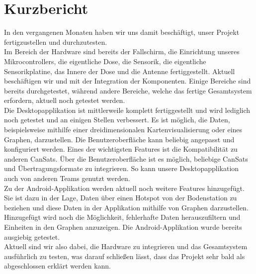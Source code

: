 \section{Kurzbericht}
In den vergangenen Monaten haben wir uns damit beschäftigt, unser Projekt fertigzustellen und durchzutesten. \\
Im Bereich der Hardware sind bereits der Fallschirm, die Einrichtung unseres Mikrocontrollers, die eigentliche Dose, die Sensorik, die eigentliche Sensorikplatine, das Innere der Dose und die Antenne fertiggestellt. Aktuell beschäftigen wir und mit der Integration der Komponenten. Einige Bereiche sind bereits durchgetestet, während andere Bereiche, welche das fertige Gesamtsystem erfordern, aktuell noch getestet werden. \\
Die Desktopapplikation ist mittlerweile komplett fertiggestellt und wird lediglich noch getestet und an einigen Stellen verbessert. Es ist möglich, die Daten, beispielsweise mithilfe einer dreidimensionalen Kartenvisualisierung oder eines Graphen, darzustellen. Die Benutzeroberfläche kann beliebig angepasst und konfiguriert werden. Eines der wichtigsten Features ist die Kompatibilität zu anderen CanSats. Über die Benutzeroberfläche ist es möglich, beliebige CanSats und Übertragungsformate zu integrieren. So kann unsere Desktopapplikation auch von anderen Teams genutzt werden. \\
Zu der Android-Applikation werden aktuell noch weitere Features hinzugefügt. Sie ist dazu in der Lage, Daten über einen Hotspot von der Bodenstation zu beziehen und diese Daten in der Applikation mithilfe von Graphen darzustellen. Hinzugefügt wird noch die Möglichkeit, fehlerhafte Daten herauszufiltern und Einheiten in den Graphen anzuzeigen. Die Android-Applikation wurde bereits ausgiebig getestet. \\
Aktuell sind wir also dabei, die Hardware zu integrieren und das Gesamtsystem ausführlich zu testen, was darauf schließen lässt, dass das Projekt sehr bald als abgeschlossen erklärt werden kann.